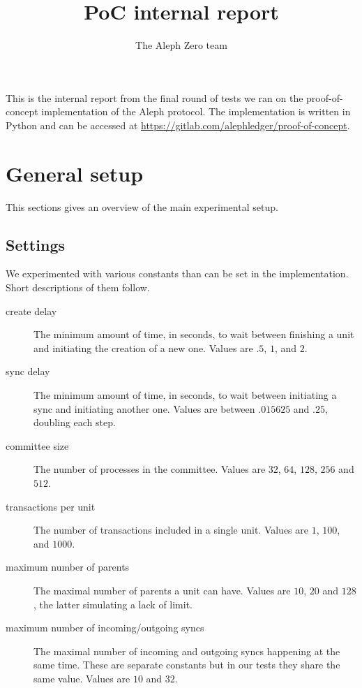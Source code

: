 \documentclass[a4paper,10pt]{article}
\title{PoC internal report}
\author{The Aleph Zero team}
\begin{document}
 \maketitle
	This is the internal report from the final round of tests we ran on the proof-of-concept implementation of the Aleph protocol.
	The implementation is written in Python and can be accessed at \url{https://gitlab.com/alephledger/proof-of-concept}.
	\section{General setup}
	This sections gives an overview of the main experimental setup.
		\subsection{Settings}
			We experimented with various constants than can be set in the implementation. Short descriptions of them follow.
			\begin{description}
				\item[create delay] The minimum amount of time, in seconds, to wait between finishing a unit and initiating the creation of a new one. Values are $.5$, $1$, and $2$.
				\item[sync delay] The minimum amount of time, in seconds, to wait between initiating a sync and initiating another one. Values are between $.015625$ and $.25$, doubling each step.
				\item[committee size] The number of processes in the committee. Values are $32$, $64$, $128$, $256$ and $512$.
				\item[transactions per unit] The number of transactions included in a single unit. Values are $1$, $100$, and $1000$.
				\item[maximum number of parents] The maximal number of parents a unit can have. Values are $10$, $20$ and $128$, the latter simulating a lack of limit.
				\item[maximum number of incoming/outgoing syncs] The maximal number of incoming and outgoing syncs happening at the same time.
					These are separate constants but in our tests they share the same value. Values are $10$ and $32$.
			\end{description}
\end{document}
